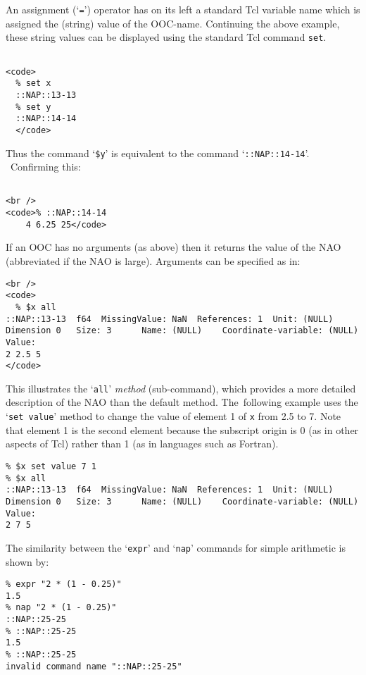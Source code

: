 An assignment (`\texttt{=}') operator has on its left a standard Tcl
    variable name which is assigned the (string) value of the OOC-name.
    Continuing the above example, these string values can be displayed
    using the standard Tcl command 
    \texttt{set}.
    \begin{verbatim}
  
<code>
  % set x
  ::NAP::13-13
  % set y
  ::NAP::14-14
  </code>
\end{verbatim}

    

Thus the command `\texttt{\$y}' is equivalent to the command `\texttt{::NAP::14-14}'. \  Confirming this:
    \begin{verbatim}
  
<br />
<code>% ::NAP::14-14
    4 6.25 25</code>
\end{verbatim}

    

If an OOC has no arguments (as above) then it returns the value
    of the NAO (abbreviated if the NAO is large). Arguments can be
    specified as in:
    \begin{verbatim}
<br />
<code>
  % $x all
::NAP::13-13  f64  MissingValue: NaN  References: 1  Unit: (NULL)
Dimension 0   Size: 3      Name: (NULL)    Coordinate-variable: (NULL)
Value:
2 2.5 5
</code>
\end{verbatim}

    

This illustrates the `\texttt{all}' 
    \emph{method} (sub-command), which provides a more detailed
    description of the NAO than the default method. The\  following
    example uses the `\texttt{set value}' method to change the value of element
    1 of 
    \texttt{x} from 2.5 to 7. Note that element 1 is the second
    element because the subscript origin is 0 (as in other aspects of
    Tcl) rather than 1 (as in languages such as Fortran).
    \begin{verbatim}
% $x set value 7 1
% $x all
::NAP::13-13  f64  MissingValue: NaN  References: 1  Unit: (NULL)
Dimension 0   Size: 3      Name: (NULL)    Coordinate-variable: (NULL)
Value:
2 7 5
\end{verbatim}

    

The similarity between the `\texttt{expr}' and `\texttt{nap}' commands for simple arithmetic is shown
    by:
    \begin{verbatim}
% expr "2 * (1 - 0.25)"
1.5
% nap "2 * (1 - 0.25)"
::NAP::25-25
% ::NAP::25-25
1.5
% ::NAP::25-25
invalid command name "::NAP::25-25"
\end{verbatim}


